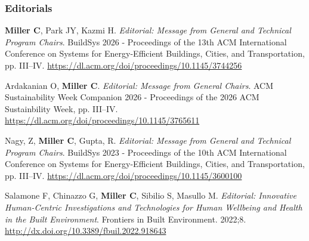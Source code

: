 \documentclass[10pt,a4paper]{article}
\begin{document}
\begin{small}
\subsubsection*{Editorials  }
\begin{etaremune}
\item
\textbf{Miller C}, Park JY, Kazmi H. \emph{Editorial: Message from General and Technical Program Chairs}. BuildSys 2026 - Proceedings of the 13th ACM International Conference on Systems for Energy-Efficient Buildings, Cities, and Transportation, pp. III–IV. \url{https://dl.acm.org/doi/proceedings/10.1145/3744256}
\item
Ardakanian O, \textbf{Miller C}. \emph{Editorial: Message from General Chairs}. ACM Sustainability Week Companion 2026 - Proceedings of the 2026 ACM Sustainbility Week, pp. III–IV. \url{https://dl.acm.org/doi/proceedings/10.1145/3765611}
\item
Nagy, Z, \textbf{Miller C}, Gupta, R. \emph{Editorial: Message from General and Technical Program Chairs}. BuildSys 2023 - Proceedings of the 10th ACM International Conference on Systems for Energy-Efficient Buildings, Cities, and Transportation, pp. III–IV. \url{https://dl.acm.org/doi/proceedings/10.1145/3600100}
\item
Salamone F, Chinazzo G, \textbf{Miller C}, Sibilio S, Masullo M. \emph{Editorial: Innovative Human-Centric Investigations and Technologies for Human Wellbeing and Health in the Built Environment}. Frontiers in Built Environment. 2022;8. \url{http://dx.doi.org/10.3389/fbuil.2022.918643}
\end{etaremune}




\end{small}
\end{document}
